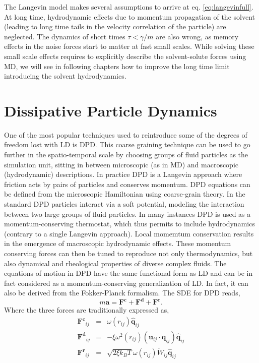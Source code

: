 \documentclass[ twoside,openright,titlepage,numbers=noenddot,%
headinclude,footinclude,cleardoublepage=empty,abstract=on,
BCOR=5mm,paper=a4,fontsize=11pt, dvipsnames
]{scrreprt}
\renewcommand{\vec}[1]{\bm{#1}}
\newcommand{\kT}{k_B T}
\newcommand{\ppos}{q}
\newcommand{\pvel}{u}
\begin{document}
The Langevin model makes several assumptions to arrive at eq. \eqref{eq:langevinfull}. At long time, hydrodynamic effects due to momentum propagation of the solvent (leading to long time tails in the velocity correlation of the particle) are neglected. The dynamics of short times $\tau<\gamma/m$ are also wrong, as memory effects in the noise forces start to matter at fast small scales. While solving these small scale effects requires to explicitly describe the solvent-solute forces using \gls{MD}, we will see in following chapters how to improve the long time limit introducing the solvent hydrodynamics.

\chapter{Dissipative Particle Dynamics}\label{ch:dpd}
One of the most popular techniques used to reintroduce some of the degrees of freedom lost with \gls{LD} is \gls{DPD}. This coarse graining technique can be used to go further in the spatio-temporal scale by choosing groups of fluid particles as the simulation unit, sitting in between microscopic (as in \gls{MD}) and macroscopic (hydrodynamic) descriptions. In practice \gls{DPD} is a Langevin approach where friction acts by pairs of particles and conserves momentum. \gls{DPD} equations can be defined from the microscopic Hamiltonian using coarse-grain theory\cite{Hijon2010}.
In the standard \gls{DPD} particles interact via a soft potential, modeling the interaction between two large groups of fluid particles.
In many instances\cite{BuscalioniPolymers} \gls{DPD} is used as a momentum-conserving thermostat, which thus permits to include hydrodynamics (contrary to a single Langevin approach). Local momemtum conservation results in the emergence of macroscopic hydrodynamic effects. These momentum conserving forces can then be tuned to reproduce not only thermodynamics, but also dynamical and rheological properties of diverse complex fluids.
The equations of motion in \gls{DPD} have the same functional form as \gls{LD} and can be in fact considered as a momentum-conserving generalization of \gls{LD}. In fact, it can also be derived from the Fokker-Planck formalism\cite{dunweg1991}. The \gls{SDE} for \gls{DPD} reads,
\begin{equation}
  \label{eq:dpddyn}
  m\vec{a} = \vec{F^c} + \vec{F^d} + \vec{F^r}.
\end{equation}
Where the three forces are traditionally expressed as,
\begin{equation}
  \label{eq:dpdforces}
  \begin{aligned}
    \vec{F^c}_{ij} &=&\omega(r_{ij})\hat{\vec{\ppos}}_{ij}\\
    \vec{F^d}_{ij} &=&-\xi\omega^2(r_{ij})(\vec{\pvel}_{ij}\cdot\vec{\ppos}_{ij})\hat{\vec{\ppos}}_{ij}\\
    \vec{F^r}_{ij} &=&\sqrt{2\xi\kT}\omega(r_{ij})\widetilde{W}_{ij}\hat{\vec{\ppos}}_{ij}    
  \end{aligned}
\end{equation}
\end{document}
